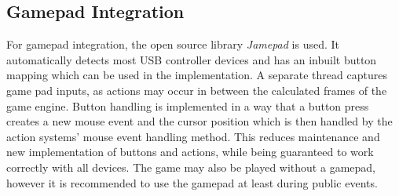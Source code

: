\subsection{Gamepad Integration}\label{subsec:gamepad-integration}
For gamepad integration, the open source library \textit{Jamepad} is used.
It automatically detects most USB controller devices and has an inbuilt button mapping which can be used in the implementation.
A separate thread captures game pad inputs, as actions may occur in between the calculated frames of the game engine.
Button handling is implemented in a way that a button press creates a new mouse event and the cursor position which is then handled by the action
systems' mouse event handling method.
This reduces maintenance and new implementation of buttons and actions, while being guaranteed to work correctly with all devices.
The game may also be played without a gamepad, however it is recommended to use the gamepad at least during public events.
